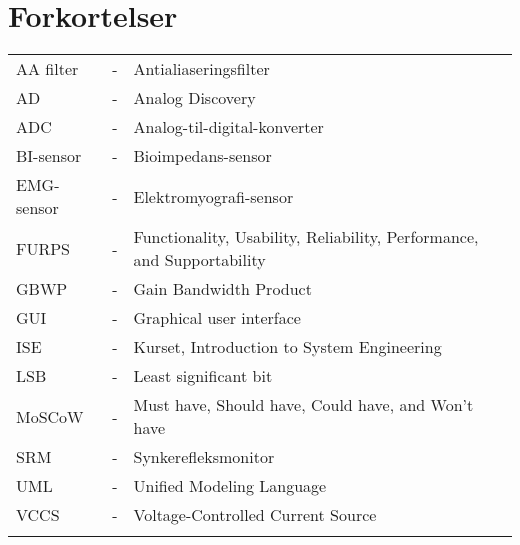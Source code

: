 \chapter{Forkortelser}
\begin{table}[H]
\center
{}
\begin{tabularx}{\linewidth}{l l X}
AA filter           & - &   Antialiaseringsfilter \\ \addlinespace[2mm]
AD  		& - &  	Analog Discovery  		\\ \addlinespace[2mm]
ADC  		& - &  	Analog-til-digital-konverter  \\ \addlinespace[2mm]
BI-sensor    & - &   Bioimpedans-sensor 		\\ \addlinespace[2mm]
EMG-sensor   & - & 	Elektromyografi-sensor 	\\ \addlinespace[2mm]
FURPS           & - &   Functionality, Usability, Reliability, Performance, and Supportability \\ \addlinespace[2mm]
GBWP 		& - &  	Gain Bandwidth Product  \\ \addlinespace[2mm]
GUI 		& - &  	Graphical user interface  \\ \addlinespace[2mm]
ISE           & - &   Kurset, Introduction to System Engineering \\ \addlinespace[2mm]
LSB  		& - & 	Least significant bit	\\ \addlinespace[2mm]
MoSCoW          & - &   Must have, Should have, Could have, and Won't have \\
SRM         & - &	Synkerefleksmonitor 	\\ \addlinespace[2mm]	
UML 		& - &  	Unified Modeling Language  \\ \addlinespace[2mm]
VCCS 		& - & 	Voltage-Controlled Current Source  \\ \addlinespace[2mm]


 \addlinespace[2mm]





\end{tabularx}
\end{table}